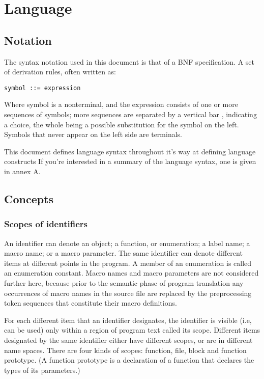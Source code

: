 \documentclass{article}
\begin{document}
\pagebreak
\section{Language}
\subsection{Notation}
The syntax notation used in this document is that of a BNF specification.  A set of
derivation rules, often written as:
\begin{lstlisting}[language=bnf]
	symbol ::= expression
\end{lstlisting}
Where symbol is a nonterminal, and the expression consists of one or more sequences of
symbols; more sequences are separated by a vertical bar \textbar, indicating a choice,
the whole being a possible substitution for the symbol on the left.  Symbols that never
appear on the left side are terminals.
\linebreak

This document defines language syntax throughout it's way at defining language
constructs If you're interested in a summary of the language syntax, one is given in 
annex A.

\subsection{Concepts}
\subsubsection{Scopes of identifiers}
An identifier can denote an object; a function, or enumeration; a label name; a macro
name; or a macro parameter. The same identifier can denote different items at different
points in the program. A member of an enumeration is called an enumeration constant.
Macro names and macro parameters are not considered further here, because prior to the
semantic phase of program translation any occurrences of macro names in the source file
are replaced by the preprocessing token sequences that constitute their macro definitions.
\linebreak

For each different item that an identifier designates, the identifier is visible (i.e, 
can be used) only within a region of program text called its scope.  Different items 
designated by the same identifier either have different scopes, or are in different name
spaces. There are four kinds of scopes: function, file, block and function prototype.
(A function prototype is a declaration of a function that declares the types of its
parameters.)
\linebreak
\end{document}
